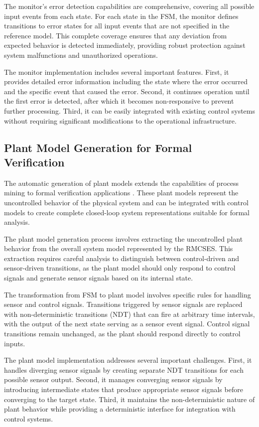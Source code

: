 The monitor's error detection capabilities are comprehensive, covering all possible input events from each state. For each state in the FSM, the monitor defines transitions to error states for all input events that are not specified in the reference model. This complete coverage ensures that any deviation from expected behavior is detected immediately, providing robust protection against system malfunctions and unauthorized operations.

The monitor implementation includes several important features. First, it provides detailed error information including the state where the error occurred and the specific event that caused the error. Second, it continues operation until the first error is detected, after which it becomes non-responsive to prevent further processing. Third, it can be easily integrated with existing control systems without requiring significant modifications to the operational infrastructure.

\subsection{Plant Model Generation for Formal Verification}

The automatic generation of plant models extends the capabilities of process mining to formal verification applications \cite{xavier2021cyber}. These plant models represent the uncontrolled behavior of the physical system and can be integrated with control models to create complete closed-loop system representations suitable for formal analysis.

The plant model generation process involves extracting the uncontrolled plant behavior from the overall system model represented by the RMCSES. This extraction requires careful analysis to distinguish between control-driven and sensor-driven transitions, as the plant model should only respond to control signals and generate sensor signals based on its internal state.

The transformation from FSM to plant model involves specific rules for handling sensor and control signals. Transitions triggered by sensor signals are replaced with non-deterministic transitions (NDT) that can fire at arbitrary time intervals, with the output of the next state serving as a sensor event signal. Control signal transitions remain unchanged, as the plant should respond directly to control inputs.

The plant model implementation addresses several important challenges. First, it handles diverging sensor signals by creating separate NDT transitions for each possible sensor output. Second, it manages converging sensor signals by introducing intermediate states that produce appropriate sensor signals before converging to the target state. Third, it maintains the non-deterministic nature of plant behavior while providing a deterministic interface for integration with control systems.

